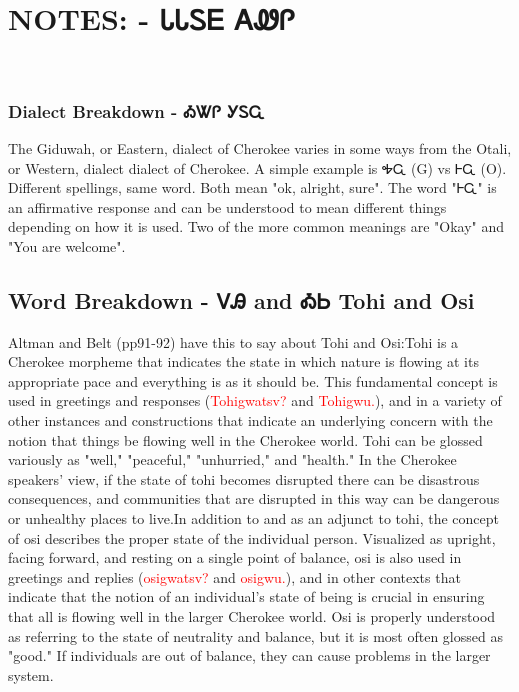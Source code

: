 \chapter*{NOTES: - ᏓᏓᏚᎬ ᎪᏪᎵ 
}
\
\subsection{Dialect Breakdown - ᎣᏔᎵ  ᎩᏚᏩ}
The Giduwah, or Eastern, dialect of Cherokee varies in some ways from the Otali, or Western, dialect dialect of Cherokee.  A simple example is ᎭᏩ (G) vs ᎰᏩ (O).  Different spellings, same word.  Both mean "ok, alright, sure".  The word "ᎰᏩ" is an affirmative response and can be understood to mean different things depending on how it is used. Two of the more common meanings are "Okay" and "You are welcome".\cite{joynerlesson4}

\label{sec:wordBreakdownTohiOsi}\section{Word Breakdown - ᏙᎯ and ᎣᏏ Tohi and Osi}Altman and Belt (pp91-92) have this to say about Tohi and Osi:Tohi is a Cherokee morpheme that indicates the state in which nature is flowing at its appropriate pace and everything is as it should be. This fundamental concept is used in greetings and responses (\textcolor{red}{Tohigwatsv?} and \textcolor{red}{Tohigwu.}), and in a variety of other instances and constructions that indicate an underlying concern with the notion that things be flowing well in the Cherokee world. Tohi can be glossed variously as "well," "peaceful," "unhurried," and "health." In the Cherokee speakers' view, if the state of tohi becomes disrupted there can be disastrous consequences, and communities that are disrupted in this way can be dangerous or unhealthy places to live.In addition to and as an adjunct to tohi, the concept of osi describes the proper state of the individual person. Visualized as upright, facing forward, and resting on a single point of balance, osi is also used in greetings and replies (\textcolor{red}{osigwatsv?} and \textcolor{red}{osigwu.}), and in other contexts that indicate that the notion of an individual’s state of being is crucial in ensuring that all is flowing well in the larger Cherokee world. Osi is properly understood as referring to the state of neutrality and balance, but it is most often glossed as "good." If individuals are out of balance, they can cause problems in the larger system.\cite{altmanBelt90-98}

